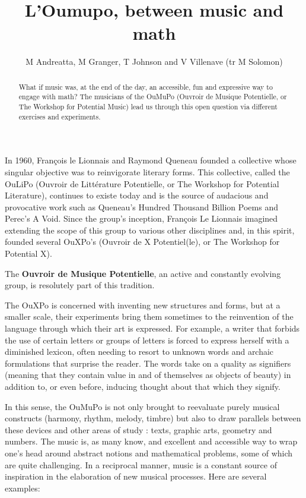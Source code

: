 \documentclass{article}
\title{L’Oumupo, between music and math}
\author{M Andreatta, M Granger, T Johnson and V Villenave
(tr M Solomon)}
\begin{document}
\maketitle
\begin{abstract}
What if music was, at the end of the day, an accessible, fun and expressive way to engage with math? The musicians of the OuMuPo (Ouvroir de Musique Potentielle, or The Workshop for Potential Music) lead us through this open question via different exercises and experiments.
\end{abstract}

In 1960, François le Lionnais and Raymond Queneau founded a collective whose singular objective was to reinvigorate literary forms. This collective, called the OuLiPo (Ouvroir de Littérature Potentielle, or The Workshop for Potential Literature), continues to existe today and is the source of audacious and provocative work such as Queneau’s Hundred Thousand Billion Poems and Perec’s A Void. Since the group’s inception, François Le Lionnais imagined extending the scope of this group to various other disciplines and, in this spirit, founded several OuXPo’s (Ouvroir de X Potentiel(le), or The Workshop for Potential
X).


The \textbf{Ouvroir de Musique Potentielle}, an active and constantly evolving group, is resolutely part of this tradition.

The OuXPo is concerned with inventing new structures and forms, but at a smaller scale, their experiments bring them sometimes to the reinvention of the language through which their art is expressed.  For example, a writer that forbids the use of certain letters or groups of letters is forced to express herself with a diminished lexicon, often needing to resort to unknown words and archaic formulations that surprise the reader.  The words take on a quality as signifiers (meaning that they contain value in and of themselves as objects of beauty) in addition to, or even before, inducing thought about that which they signify.

In this sense, the OuMuPo is not only brought to reevaluate purely musical constructs (harmony, rhythm, melody, timbre) but also to draw parallels between these devices and other areas of study : texts, graphic arts, geometry and numbers.  The music is, as many know, and excellent and accessible way to wrap one’s head around abstract notions and mathematical problems, some of which are quite challenging.  In a reciprocal manner, music is a constant source of inspiration in the elaboration of new musical processes.  Here are several examples:
\end{document}
